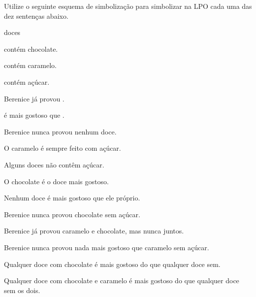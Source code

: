 \problempart
\label{pr.QLcandies}
Utilize o seguinte esquema de simbolização para simbolizar na LPO cada uma das dez sentenças abaixo.
\begin{center}
\begin{ekey}
\item[\text{domínio}] doces
\item[\atom{C}{x}]  contém chocolate.
\item[\atom{M}{x}]  contém caramelo.
\item[\atom{A}{x}]  contém açúcar.
\item[\atom{B}{x}] Berenice já provou .
\item[\atom{G}{x,y}]  é mais gostoso que .
\end{ekey}
\end{center}
\begin{earg}
\item Berenice nunca provou nenhum doce.
\item O caramelo é sempre feito com açúcar.
\item Alguns doces não contêm açúcar.
\item O chocolate é o doce mais gostoso.
\item Nenhum doce é mais gostoso que ele próprio.
\item Berenice nunca provou chocolate sem açúcar.
\item Berenice já provou caramelo e chocolate, mas nunca juntos.
\item Berenice nunca provou nada mais gostoso que caramelo sem açúcar.
\item Qualquer doce com chocolate é mais gostoso do que qualquer doce sem.
\item Qualquer doce com chocolate e caramelo é mais gostoso do que qualquer doce sem os dois.
\end{earg}

